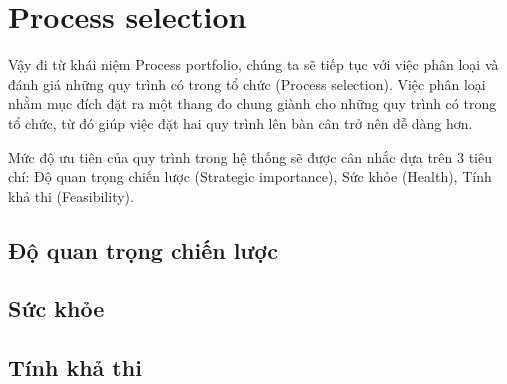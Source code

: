 \section{Process selection}
Vậy đi từ khái niệm Process portfolio, chúng ta sẽ tiếp tục với việc phân loại và đánh giá những quy trình có trong tổ chức (Process selection). Việc phân loại nhằm mục đích đặt ra một thang đo chung giành cho những quy trình có trong tổ chức, từ đó giúp việc đặt hai quy trình lên bàn cân trở nên dễ dàng hơn.

Mức độ ưu tiên của quy trình trong hệ thống sẽ được cân nhắc dựa trên 3 tiêu chí: Độ quan trọng chiến lược (Strategic importance), Sức khỏe (Health), Tính khả thi (Feasibility).

\subsection{Độ quan trọng chiến lược}
    
\subsection{Sức khỏe}
    
\subsection{Tính khả thi}
    